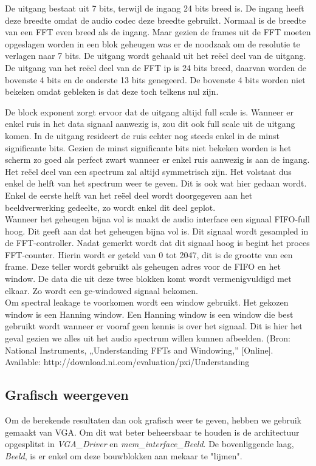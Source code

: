 \documentclass[a4paper,kul]{kulakarticle} %
\begin{document}
De uitgang bestaat uit 7 bits, terwijl de ingang 24 bits breed is. De ingang heeft deze breedte omdat de audio codec deze breedte gebruikt. Normaal is de breedte van een FFT even breed als de ingang. Maar gezien de frames uit de FFT moeten opgeslagen worden in een blok geheugen was er de noodzaak om de resolutie te verlagen naar 7 bits. De uitgang wordt gehaald uit het reëel deel van de uitgang. De uitgang van het reëel deel van de FFT ip is 24 bits breed, daarvan worden de bovenste 4 bits en de onderste 13 bits genegeerd. De bovenste 4 bits worden niet bekeken omdat gebleken is dat deze toch telkens nul zijn.

De block exponent zorgt ervoor dat de uitgang altijd full scale is. Wanneer er enkel ruis in het data signaal aanwezig is, zou dit ook full scale uit de uitgang komen.  In de uitgang resideert de ruis echter nog steeds enkel in de minst significante bits. Gezien de minst significante bits niet bekeken worden is het scherm zo goed als perfect zwart wanneer er enkel ruis aanwezig is aan de ingang.
Het reëel deel van een spectrum zal altijd symmetrisch zijn. Het volstaat dus enkel de helft van het spectrum weer te geven. Dit is ook wat hier gedaan wordt. Enkel de eerste helft van het reëel deel wordt doorgegeven aan het beeldverwerking gedeelte, zo wordt enkel dit deel geplot.\\

Wanneer het geheugen bijna vol is maakt de audio interface een signaal FIFO-full hoog. Dit geeft aan dat het geheugen bijna vol is. Dit signaal wordt gesampled in de FFT-controller. Nadat gemerkt wordt dat dit signaal hoog is begint het proces FFT-counter. Hierin wordt er geteld van 0 tot 2047, dit is de grootte van een frame. Deze teller wordt gebruikt als geheugen adres voor de FIFO en het window. De data die uit deze twee blokken komt wordt vermenigvuldigd met elkaar. Zo wordt een ge-windowed signaal bekomen.\\

Om spectral leakage te voorkomen wordt een window gebruikt. Het gekozen window is een Hanning window. Een Hanning window is een window die best gebruikt wordt wanneer er vooraf geen kennis is over het signaal. Dit is hier het geval gezien we alles uit het audio spectrum willen kunnen afbeelden.
(Bron: National Instruments, „Understanding FFTs and Windowing,” [Online]. Available: http://download.ni.com/evaluation/pxi/Understanding%


\subsection{Grafisch weergeven}
Om de berekende resultaten dan ook grafisch weer te geven, hebben we gebruik gemaakt van VGA. Om dit wat beter beheersbaar te houden is de architectuur opgesplitst in \textit{VGA\_Driver} en \textit{mem\_interface\_Beeld}. De bovenliggende laag, \textit{Beeld}, is er enkel om deze bouwblokken aan mekaar te "lijmen".\\
\end{document}
